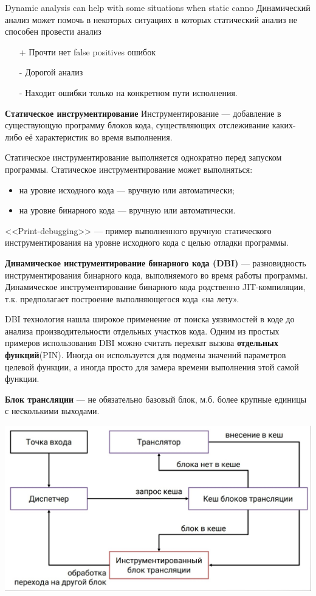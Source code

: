 
Dynamic analysis can help with some situations when static canno
Динамический анализ может помочь в некоторых ситуациях в которых статический анализ не способен провести анализ
\begin{itemize}
    \item[+] Прочти нет false positives ошибок
    \item[-] Дорогой анализ
    \item[-] Находит ошибки только на конкретном пути исполнения.
\end{itemize}

\textbf{Статическое инструментирование}
Инструментирование — добавление в существующую программу блоков кода, существляющих отслеживание каких-либо её характеристик во время выполнения.

Статическое инструментирование выполняется однократно перед запуском программы.
Статическое инструментирование может выполняться:
\begin{itemize}
    \item на уровне исходного кода — вручную или автоматически;
    \item на уровне бинарного кода — вручную или автоматически.
\end{itemize}

<<Print-debugging>> — пример выполненного вручную статического инструментирования на уровне исходного кода с целью отладки программы.

\textbf{Динамическое инструментирование бинарного кода (DBI)} — разновидность инструментирования бинарного кода, выполняемого во время работы программы. Динамическое инструментирование бинарного кода родственно JIT-компиляции, т.к. предполагает построение выполняющегося кода «на лету».

DBI технология нашла широкое применение от поиска уязвимостей в коде до анализа производительности отдельных участков кода. Одним из простых примеров использования DBI можно считать перехват вызова \textbf{отдельных функций}(PIN). Иногда он используется для подмены значений параметров целевой функции, а иногда просто для замера времени выполнения этой самой функции.

\textbf{Блок трансляции} — не обязательно базовый блок, м.б. более крупные единицы с несколькими выходами.

\includegraphics[scale=0.2]{pics/dinamic.png}

